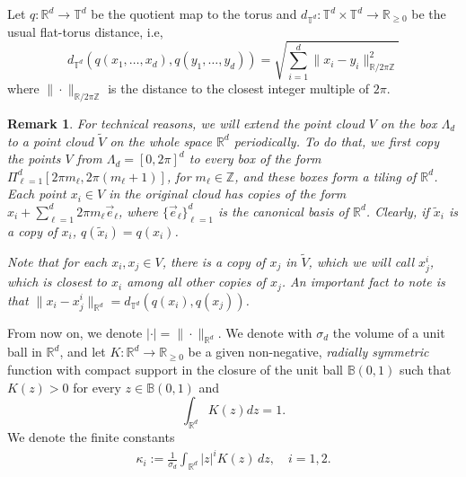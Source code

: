 \documentclass[a4paper,11pt]{amsart}
\newtheorem{remark}[theorem]{Remark}
\newcommand{\red}[1]{{#1}}
\newcommand{\B}{\mathbb{B}}
\newcommand{\R}{\mathbb{R}}
\newcommand{\T}{\mathbb{T}}
\newcommand{\Z}{\mathbb{Z}}
\newcommand{\wt}{\widetilde}
\newcommand{\ep}{\epsilon}
\newcommand{\patu}[1]{{{\color{red}#1}}}
\newcommand{\hernan}[1]{{{\color{magenta}#1}}}
\numberwithin{equation}{section}
\numberwithin{theorem}{section}
\theoremstyle{definition}
\begin{document}
\red{Let $q:\mathbb{R}^d \to \mathbb{T}^d$ be the quotient map to the torus and $d_{\mathbb{T}^d}: \mathbb{T}^d \times \mathbb{T}^d \to \mathbb{R}_{\geq 0}$ be the usual flat-torus distance, i.e,
\[
d_{\T^d}(q(x_1,\ldots,x_d),q(y_1,\ldots,y_d)) = \sqrt{\sum_{i=1}^d \|x_i - y_i\|^2_{\mathbb{R}/2\pi\mathbb{Z}}}
\]
where $\|\cdot\|_{\mathbb{R}/2\pi\mathbb{Z}}$ is the distance to the closest integer multiple of $2\pi$.

\begin{remark}
\label{rmk:tor-dist}
For technical reasons, we will extend the point cloud $V$ on the box $\Lambda_d$ to a point cloud $\tilde V$ on the whole space $\R^d$ periodically. To do that, we first copy the points $V$ from $\Lambda_d=[0,2\pi]^d$ to every box of the form $\Pi_{\ell=1}^d[2\pi m_\ell, 2\pi (m_\ell+1)]$, for $m_\ell\in\Z$, and these boxes form a tiling of $\R^d$. Each point $x_i\in V$ in the original cloud has copies of the form $x_i+\sum_{\ell=1}^d2\pi m_\ell \vec e_\ell$, where $\{\vec e_\ell\}_{\ell=1}^d$ is the canonical basis of $\R^d$. Clearly, if $\tilde x_i$ is a copy of $x_i$, $q(\tilde x_i)=q(x_i)$.

Note that for each $x_i,x_j \in V$, there is a copy of $x_j$ in $\tilde V$, which we will call $x^i_j$, which is closest to $x_i$ among all other copies of $x_j$. An important fact to note is that $\|x_i - x^i_j\|_{\mathbb{R}^d} = d_{\mathbb{T}^d} (q(x_i),q(x_j))$.
\end{remark}
} 

From now on, we denote $|\cdot|=\|\cdot\|_{\R^d}$. We denote with $\sigma_d$ the volume of a unit ball in $\R^d$, and let $K:\R^d\to\R_{\ge0}$ be a given non-negative, {\it{radially symmetric}} function with compact support in the closure of the unit ball $\B(0,1)$ such that $K(z)>0$ for every $z\in\B(0,1)$ and $$\int_{\R^d} K(z)dz=1.$$ 
We denote the finite constants
\begin{align}\label{kappa-2}
\kappa_i:= \frac{1}{\sigma_d}\int_{\R^d}|z|^iK(z)\, dz, \quad i=1,2.
\end{align}


\end{document}
